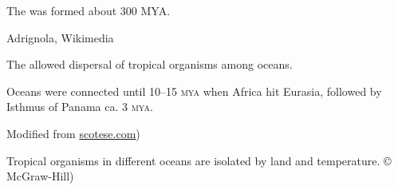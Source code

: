 \documentclass[t]{beamer}
\begin{document}
%
{
\begin{frame}[b]{The  was formed about 300 MYA.}

\hfill \tiny Adrignola, Wikimedia 

\end{frame}
}
%
{
\begin{frame}[b]{The  allowed dispersal of tropical organisms among oceans.}

\hangpara Oceans were connected until 10–15 \textsc{mya} when Africa hit Eurasia, followed by Isthmus of Panama ca. 3 \textsc{mya}.

\tiny \hfill Modified from \url{scotese.com})

\end{frame}
}
%
{
\begin{frame}[b]{Tropical organisms in different oceans are isolated by land and temperature.}
\tiny \copyright\,McGraw-Hill)
\end{frame}
}
%
\end{document}
